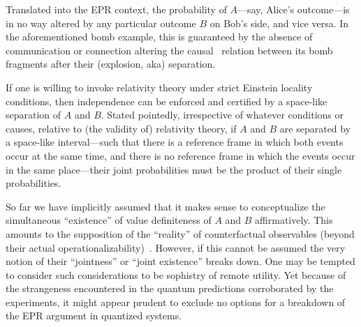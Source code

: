 \documentclass[entropy,article,accept,oneauthor,pdftex]{Definitions/mdpi}
\begin{document}
Translated into the EPR context, the probability of $A$---say, Alice's outcome---is in no way altered by any particular outcome $B$ on Bob's side, and vice versa.
In the aforementioned bomb example, this is guaranteed by the absence of communication or connection altering the
causal~\cite{frank,franke,Korotaev-2010,pearl-causality} relation between its bomb fragments after their (explosion, aka) separation.

If one is willing to invoke relativity theory under strict Einstein locality conditions,
then independence can be enforced and certified by a space-like separation of $A$ and $B$.
Stated pointedly, irrespective of whatever conditions or causes, relative to (the validity of) relativity theory,
if $A$ and $B$ are separated by a space-like interval---such that there is a reference frame in which both events occur at the same time,
and there is no reference frame in which the events occur in the same place---their joint probabilities must be the product of their single probabilities.

So far we have implicitly assumed that it makes sense to conceptualize the simultaneous  ``existence''
of value definiteness of  $A$ and $B$ affirmatively.
This amounts to the supposition of the  ``reality'' of counterfactual observables (beyond their actual operationalizability)~\cite{specker-60}.
However, if this cannot be assumed the very notion of their ``jointness'' or ``joint existence'' breaks down.
One may be tempted to consider such considerations to be sophistry of remote utility.
Yet because of the strangeness encountered in the quantum predictions corroborated by the experiments,
it might appear prudent to exclude no options for a breakdown of the EPR argument in quantized systems.
\end{document}

